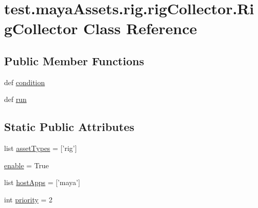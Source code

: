 \hypertarget{classtest_1_1mayaAssets_1_1rig_1_1rigCollector_1_1RigCollector}{\section{test.\-maya\-Assets.\-rig.\-rig\-Collector.\-Rig\-Collector \-Class \-Reference}
\label{d2/d7d/classtest_1_1mayaAssets_1_1rig_1_1rigCollector_1_1RigCollector}
}
\subsection*{\-Public \-Member \-Functions}
\begin{DoxyCompactItemize}
\item 
def \hyperlink{classtest_1_1mayaAssets_1_1rig_1_1rigCollector_1_1RigCollector_ae8d662f039d194780b79022ed653630a}{condition}
\item 
def \hyperlink{classtest_1_1mayaAssets_1_1rig_1_1rigCollector_1_1RigCollector_af277acb036b3b994c6a5268c1b526620}{run}
\end{DoxyCompactItemize}
\subsection*{\-Static \-Public \-Attributes}
\begin{DoxyCompactItemize}
\item 
list \hyperlink{classtest_1_1mayaAssets_1_1rig_1_1rigCollector_1_1RigCollector_a0ca8172807ec8cacd0485bc5e1a23036}{asset\-Types} = \mbox{[}'rig'\mbox{]}
\item 
\hyperlink{classtest_1_1mayaAssets_1_1rig_1_1rigCollector_1_1RigCollector_aed1d10d1bd496b94377786e82dd966a4}{enable} = \-True
\item 
list \hyperlink{classtest_1_1mayaAssets_1_1rig_1_1rigCollector_1_1RigCollector_aaa54eeb43f9e8a17f399be7551f5f5de}{host\-Apps} = \mbox{[}'maya'\mbox{]}
\item 
int \hyperlink{classtest_1_1mayaAssets_1_1rig_1_1rigCollector_1_1RigCollector_a910bb57f3d792bafcf5b8fb8880d8fe7}{priority} = 2
\end{DoxyCompactItemize}


